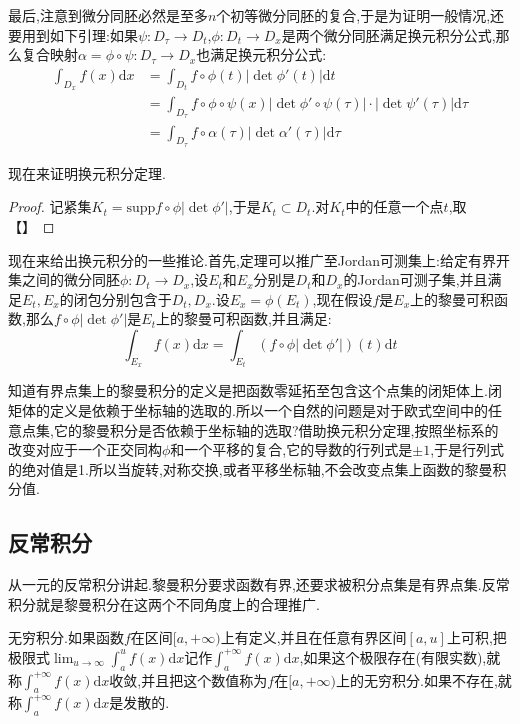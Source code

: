 最后,注意到微分同胚必然是至多$n$个初等微分同胚的复合,于是为证明一般情况,还要用到如下引理:如果$\psi:D_{\tau}\to D_t$,$\phi:D_t\to D_x$是两个微分同胚满足换元积分公式,那么复合映射$\alpha=\phi\circ\psi:D_{\tau}\to D_x$也满足换元积分公式:
\begin{align*}
\int_{D_x}f(x)\mathrm{d}x &=\int_{D_t}f\circ\phi(t)|\det\phi'(t)|\mathrm{d}t \\
&=\int_{D_{\tau}}f\circ\phi\circ\psi(x)|\det\phi'\circ\psi(\tau)|\cdot|\det\psi'(\tau)|\mathrm{d}\tau \\
&=\int_{D_{\tau}}f\circ\alpha(\tau)|\det\alpha'(\tau)|\mathrm{d}\tau
\end{align*}

现在来证明换元积分定理.
\begin{proof}
	
	记紧集$K_t=\mathrm{supp}f\circ\phi|\det\phi'|$,于是$K_t\subset D_t$.对$K_t$中的任意一个点$t$,取【】
	
\end{proof}

现在来给出换元积分的一些推论.首先,定理可以推广至Jordan可测集上:给定有界开集之间的微分同胚$\phi:D_t\to D_x$,设$E_t$和$E_x$分别是$D_t$和$D_x$的Jordan可测子集,并且满足$E_t,E_x$的闭包分别包含于$D_t,D_x$.设$E_x=\phi(E_t)$,现在假设$f$是$E_x$上的黎曼可积函数,那么$f\circ\phi|\det\phi'|$是$E_t$上的黎曼可积函数,并且满足:
$$\int_{E_x}f(x)\mathrm{d}x=\int_{E_t}\left(f\circ\phi|\det\phi'|\right)(t)\mathrm{d}t$$

知道有界点集上的黎曼积分的定义是把函数零延拓至包含这个点集的闭矩体上.闭矩体的定义是依赖于坐标轴的选取的.所以一个自然的问题是对于欧式空间中的任意点集,它的黎曼积分是否依赖于坐标轴的选取?借助换元积分定理,按照坐标系的改变对应于一个正交同构$\phi$和一个平移的复合,它的导数的行列式是$\pm1$,于是行列式的绝对值是1.所以当旋转,对称交换,或者平移坐标轴,不会改变点集上函数的黎曼积分值.
\newpage
\subsection{反常积分}

从一元的反常积分讲起.黎曼积分要求函数有界,还要求被积分点集是有界点集.反常积分就是黎曼积分在这两个不同角度上的合理推广.

无穷积分.如果函数$f$在区间$[a,+\infty)$上有定义,并且在任意有界区间$[a,u]$上可积,把极限式$\lim_{u\to\infty}\int_a^uf(x)\mathrm{d}x$记作$\int_a^{+\infty}f(x)\mathrm{d}x$,如果这个极限存在(有限实数),就称$\int_a^{+\infty}f(x)\mathrm{d}x$收敛,并且把这个数值称为$f$在$[a,+\infty)$上的无穷积分.如果不存在,就称$\int_a^{+\infty}f(x)\mathrm{d}x$是发散的.

